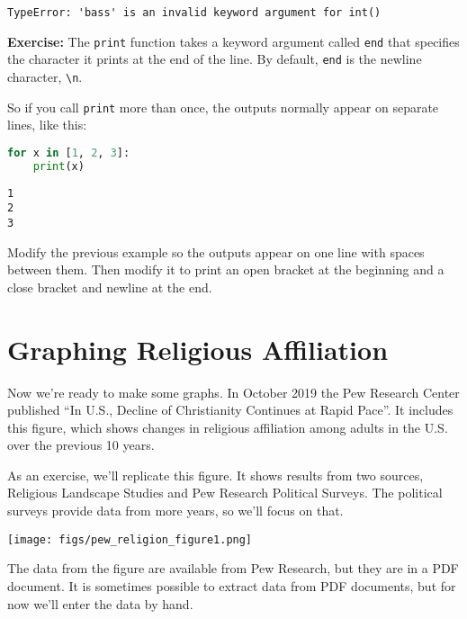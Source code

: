 \begin{lstlisting}[style=output]
TypeError: 'bass' is an invalid keyword argument for int()
\end{lstlisting}

\textbf{Exercise:} The \passthrough{\lstinline!print!} function takes a
keyword argument called \passthrough{\lstinline!end!} that specifies the
character it prints at the end of the line. By default,
\passthrough{\lstinline!end!} is the newline character,
\passthrough{\lstinline!\\n!}.

\pagebreak

So if you call \passthrough{\lstinline!print!} more than once, the outputs normally appear on separate lines, like this:

\begin{lstlisting}[language=Python,style=source]
for x in [1, 2, 3]:
    print(x)
\end{lstlisting}

\begin{lstlisting}[style=output]
1
2
3
\end{lstlisting}

Modify the previous example so the outputs appear on one line with
spaces between them. Then modify it to print an open bracket at the
beginning and a close bracket and newline at the end.

\section{Graphing Religious
Affiliation}\label{graphing-religious-affiliation}

Now we're ready to make some graphs. In October 2019 the Pew Research
Center published ``In U.S., Decline of Christianity Continues at Rapid
Pace''. It includes this figure, which shows changes in religious
affiliation among adults in the U.S. over the previous 10 years.

As an exercise, we'll replicate this figure. It shows results from two
sources, Religious Landscape Studies and Pew Research Political Surveys.
The political surveys provide data from more years, so we'll focus on
that.

\texttt{[image: figs/pew\_religion\_figure1.png]}

The data from the figure are available from Pew Research, but they are
in a PDF document. It is sometimes possible to extract data from PDF
documents, but for now we'll enter the data by hand.

